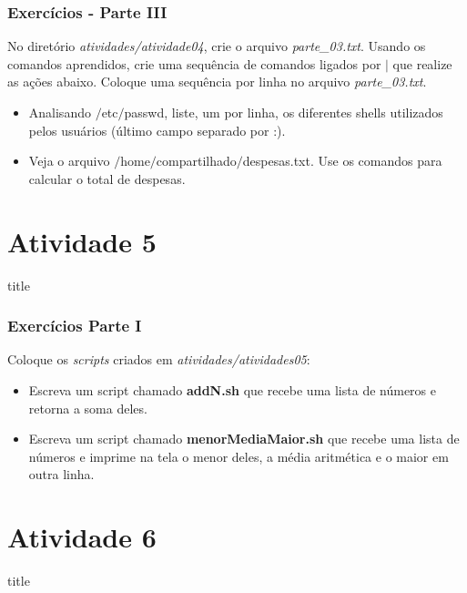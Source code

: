 \documentclass{beamer}
\begin{document}
   \begin{frame}
      \frametitle{Exercícios - Parte III}
      No diretório \textit{atividades/atividade04}, crie o arquivo \textit{parte\_03.txt}. Usando os comandos aprendidos, crie uma sequência de comandos ligados por $|$ 
que realize as ações abaixo. Coloque uma sequência por linha no arquivo \textit{parte\_03.txt}.
      \begin{itemize}
         \item Analisando $/$etc$/$passwd, liste, um por linha, os diferentes shells utilizados pelos usuários (último campo separado por :). 
	 \item Veja o arquivo $/$home$/$compartilhado$/$despesas.txt. Use os comandos para calcular o total de despesas.
      \end{itemize}
   \end{frame}

\section{Atividade 5}
   \begin{frame}
      \begin{beamercolorbox}[sep=8pt,center,shadow=true,rounded=true]{title}
      \insertsectionhead\par%
      \end{beamercolorbox}
   \end{frame}
   \begin{frame}
      \frametitle{Exercícios Parte I}
      Coloque os \textit{scripts} criados em \textit{atividades/atividades05}:
      \begin{itemize}
         \item Escreva um script chamado \textbf{addN.sh} que recebe uma lista de números e retorna a soma deles.
	 \item Escreva um script chamado \textbf{menorMediaMaior.sh} que recebe uma lista de números e imprime na tela o menor deles, a média aritmética e o maior em outra linha. 
      \end{itemize}
   \end{frame}

\section{Atividade 6}
   \begin{frame}
      \begin{beamercolorbox}[sep=8pt,center,shadow=true,rounded=true]{title}
      \insertsectionhead\par%
      \end{beamercolorbox}
   \end{frame}
\end{document}
